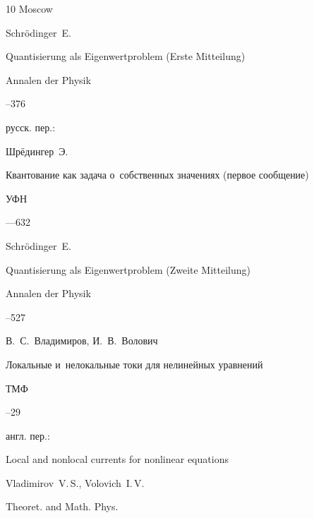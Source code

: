\begin{thebibliography}{10}
\publaddr Moscow 






\by Schr\"odinger~E.

\paper  Quantisierung als Eigenwertproblem (Erste Mitteilung)

\jour Annalen der Physik



--376


\rtransl русск. пер.:~

\by Шрёдингер~Э.

\paper Квантование как задача о~собственных значениях (первое сообщение)

\jour УФН




—632




\by Schr\"odinger~E.

\paper Quantisierung als Eigenwertproblem (Zweite Mitteilung)

\jour Annalen der Physik



--527





\by В.~С.~Владимиров, И.~В.~Волович

\paper Локальные и~нелокальные токи для нелинейных уравнений

\jour ТМФ




--29

\transl англ. пер.:~

\paper Local and nonlocal currents for nonlinear equations

\by Vladimirov~V.\,S., Volovich~I.\,V.

\jour Theoret. and Math. Phys.



\end{thebibliography}

